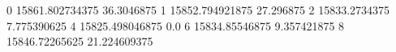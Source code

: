 0 15861.802734375 36.3046875
1 15852.794921875 27.296875
2 15833.2734375 7.775390625
4 15825.498046875 0.0
6 15834.85546875 9.357421875
8 15846.72265625 21.224609375
